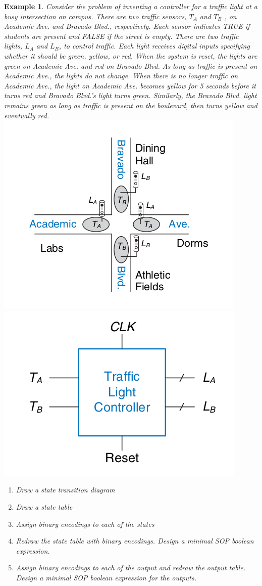 \documentclass{article}
\newtheorem{example}{Example}
\begin{document}
\begin{example}
  Consider the problem of inventing a controller for a traffic light at a busy
  intersection on campus. There are two traffic
  sensors, $T_A$ and $T_B$ , on Academic Ave. and Bravado Blvd., respectively.
  Each sensor indicates TRUE if students are present and FALSE if the
  street is empty. There are two traffic lights, $L_A$ and $L_B$, to control
  traffic. Each light receives digital inputs specifying whether it should be
  green, yellow, or red.
  When the system is reset, the lights are green on Academic Ave. and red on Bravado Blvd.
  As long as traffic is present on Academic Ave., the lights do not change. When there
  is no longer traffic on Academic Ave., the light on Academic Ave.
  becomes yellow for 5 seconds before it turns red and Bravado Blvd.’s light
  turns green. Similarly, the Bravado Blvd. light remains green as long as
  traffic is present on the boulevard, then turns yellow and eventually red.
  \\
  \includegraphics[width=0.5\linewidth]{./fig/fig3.23-campus-map.png}
  \includegraphics[width=0.5\linewidth]{./fig/fig3.24-traffic-light-controller.png}
  \begin{enumerate}
  \item Draw a state transition diagram
  \item Draw a state table 
  \item Assign binary encodings to each of the states
  \item Redraw the state table with binary encodings. Design a minimal SOP
    boolean expression.
  \item Assign binary encodings to each of the output and redraw the output
    table. Design a minimal SOP boolean expression for the outputs.
  \end{enumerate}
\end{example}
\end{document}
